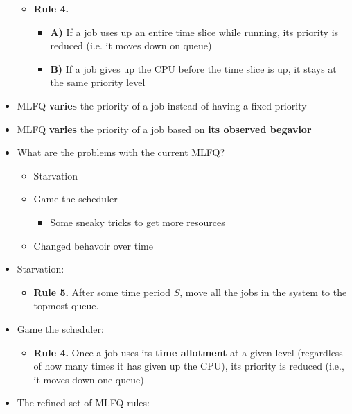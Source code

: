 \documentclass[a4paper,11pt,english]{article}
\begin{document}
\begin{itemize}
\begin{itemize}
            \item \textbf{\color{blue} Rule 4.}
                \begin{itemize}
                    \item \textbf{\color{blue} A)} If a job uses up an entire time slice while running, its priority is reduced (i.e. it moves down on queue)
                    \item \textbf{\color{blue} B)} If a job gives up the CPU before the time slice is up, it stays at the same priority level
                \end{itemize}
        \end{itemize}
    \item MLFQ \textbf{\color{blue} varies} the priority of a job instead of having a fixed priority
    \item MLFQ \textbf{\color{blue} varies} the priority of a job based on \textbf{\color{blue} its observed begavior}
    \item What are the problems with the current MLFQ?
        \begin{itemize}
            \item Starvation
            \item Game the scheduler
                \begin{itemize}
                \item Some sneaky tricks to get more resources
                \end{itemize}
            \item Changed behavoir over time
        \end{itemize}
    \item Starvation:
        \begin{itemize}
            \item \textbf{Rule 5.} After some time period $S$, move all the jobs in the system to the topmost queue.
        \end{itemize} 
    \item Game the scheduler:
        \begin{itemize}
            \item \textbf{Rule 4.} Once a job uses its \textbf{\color{red} time allotment} at a given level (regardless of how many times it has given up the CPU), its priority is reduced (i.e., it moves down one queue)
        \end{itemize} 
    \item The refined set of MLFQ rules:
        \begin{itemize}

\end{itemize}
\end{itemize}
\end{document}

